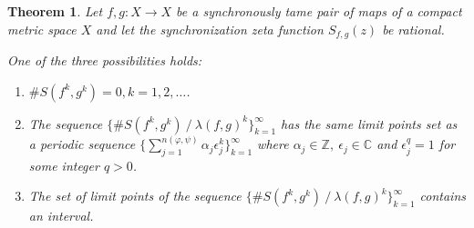 \documentclass[oneside]{amsart}
\def\Z{\mathbb{Z}}
\def\C{\mathbb{C}}
\newtheorem{thm}{Theorem}
\begin{document}
\begin{thm}\label{thm:synchronization-asymptotic-sequence}
  Let $f,g: X \to X$ be a synchronously tame pair of maps of a compact metric space $X$
  and let the synchronization zeta function $S_{f, g}(z)$ be rational.

  One of the three possibilities holds:
  \begin{enumerate}
    \item[\rm (i)] $\#S(f^k,g^k) = 0, k=1, 2, \dots$.
    \item[\rm (ii)] The sequence $\{ \# S(f^k, g^k) \ / \ \lambda(f, g)^k \}_{k=1}^\infty$ has the same
      limit points set as a periodic sequence $\{ \sum_{j=1}^{n(\varphi, \psi)} \alpha_j \epsilon_j^k \}_{k=1}^\infty$
      where $\alpha_j \in \Z, \ \epsilon_j \in \C$ and $\epsilon_j^q = 1$ for some integer $q>0$.
    \item[\rm (iii)] The set of limit points of the sequence $\{ \# S(f^k, g^k) \ / \ \lambda(f, g)^k \}_{k=1}^\infty$
      contains an interval.
  \end{enumerate}
\end{thm}
\end{document}
